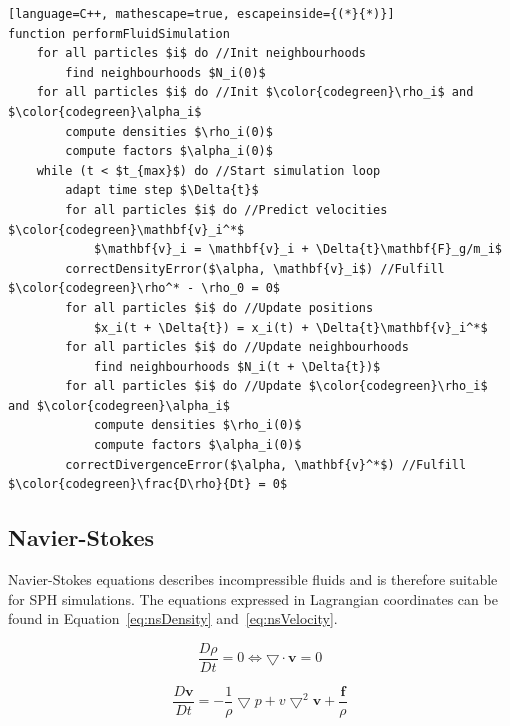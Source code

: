 \begin{lstlisting}[language=C++, mathescape=true, escapeinside={(*}{*)}]
function performFluidSimulation
    for all particles $i$ do //Init neighbourhoods
        find neighbourhoods $N_i(0)$
    for all particles $i$ do //Init $\color{codegreen}\rho_i$ and $\color{codegreen}\alpha_i$
        compute densities $\rho_i(0)$
        compute factors $\alpha_i(0)$
    while (t < $t_{max}$) do //Start simulation loop
        adapt time step $\Delta{t}$ 
        for all particles $i$ do //Predict velocities $\color{codegreen}\mathbf{v}_i^*$
            $\mathbf{v}_i = \mathbf{v}_i + \Delta{t}\mathbf{F}_g/m_i$
        correctDensityError($\alpha, \mathbf{v}_i$) //Fulfill $\color{codegreen}\rho^* - \rho_0 = 0$
        for all particles $i$ do //Update positions
            $x_i(t + \Delta{t}) = x_i(t) + \Delta{t}\mathbf{v}_i^*$
        for all particles $i$ do //Update neighbourhoods
            find neighbourhoods $N_i(t + \Delta{t})$
        for all particles $i$ do //Update $\color{codegreen}\rho_i$ and $\color{codegreen}\alpha_i$ 
            compute densities $\rho_i(0)$
            compute factors $\alpha_i(0)$
        correctDivergenceError($\alpha, \mathbf{v}^*$) //Fulfill $\color{codegreen}\frac{D\rho}{Dt} = 0$
\end{lstlisting}

\subsection{Navier-Stokes}
    Navier-Stokes equations describes incompressible fluids and is therefore suitable for SPH simulations. The equations expressed in Lagrangian coordinates can be found in Equation~\ref{eq:nsDensity} and~\ref{eq:nsVelocity}.

    \begin{equation} \label{eq:nsDensity}
        \frac{D\rho}{Dt} = 0 \Leftrightarrow \bigtriangledown \cdot \textbf{v} = 0 
    \end{equation}

    \begin{equation} \label{eq:nsVelocity}
        \frac{D\textbf{v}}{Dt} = -\frac{1}{\rho} \bigtriangledown p + v \bigtriangledown ^2 \textbf{v} + \frac{\textbf{f}}{\rho}
    \end{equation}

